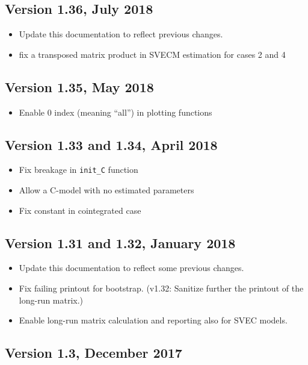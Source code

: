 \documentclass[a4paper,10pt]{article}
\begin{document}
\subsection*{Version 1.36,  July 2018}
\begin{itemize}
\item Update this documentation to reflect previous changes.

\item fix a transposed matrix product in SVECM estimation for cases 2
  and 4
\end{itemize}

\subsection*{Version 1.35,  May 2018}
\begin{itemize}
\item Enable 0 index (meaning ``all'') in plotting functions
\end{itemize}

\subsection*{Version 1.33 and 1.34, April 2018}
\begin{itemize}
\item Fix breakage in \verb|init_C| function
\item Allow a C-model with no estimated parameters
\item Fix constant in cointegrated case
\end{itemize}

\subsection*{Version 1.31 and 1.32, January 2018}
\begin{itemize}
\item Update this documentation to reflect some previous changes.

\item Fix failing printout for bootstrap. 
(v1.32: Sanitize further the printout of the long-run matrix.)

\item Enable long-run matrix calculation and reporting also for SVEC models.
\end{itemize}

\subsection*{Version 1.3, December 2017}
\end{document}
